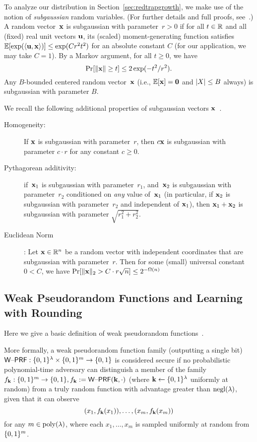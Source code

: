 To analyze our distribution in Section~\ref{sec:redtrapgrowth}, we
make use of the notion of \emph{subgaussian} random variables.  (For
further details and full proofs,
see~\cite{vershynin12:_compr_sensin_theor_applic}.)  A random
vector~$\mathbf{x}$ is subgaussian with parameter~$r > 0$ if for all $t \in \mathbb{R}$
and all (fixed) real unit vectors $\mathbf{u}$, its (scaled)
moment-generating function satisfies
$\operatorname*{\mathbb{E}}[\exp(\langle\mathbf{u},\mathbf{x}\rangle)] \leq \exp(C r^{2} t^{2})$ for an
absolute constant $C$ (for our application, we may take $C=1$).  By a Markov
argument, for all $t \geq 0$, we have
\begin{equation}
  \label{eq:subgaussian-tails}
  \Pr[\lVert\mathbf{x}\rVert \geq t] \leq 2 \exp(- t^{2}/r^{2}).
\end{equation}
 Any
$B$-bounded centered random vector~$\mathbf{x}$ (i.e., $\operatorname*{\mathbb{E}}[\mathbf{x}]=\mathbf{0}$ and $\lvert X\rvert
\leq B$ always) is subgaussian with parameter $B$.

We recall the following additional properties of subgaussian vectors
$\mathbf{x}$~\cite{vershynin12:_compr_sensin_theor_applic}.
\begin{description}
\item[Homogeneity:] If $\mathbf{x}$ is subgaussian with
parameter~$r$, then $c\mathbf{x}$ is subgaussian with parameter $c \cdot r$ for
any constant $c \geq 0$.
\item[Pythagorean
  additivity:] if~$\mathbf{x}_{1}$ is subgaussian with parameter~$r_{1}$,
and~$\mathbf{x}_{2}$ is subgaussian with parameter~$r_{2}$ conditioned on
\emph{any} value of~$\mathbf{x}_{1}$ (in particular, if $\mathbf{x}_2$ is
subgaussian with parameter~$r_2$ and independent of $\mathbf{x}_{1}$), then $\mathbf{x}_{1} + \mathbf{x}_{2}$ is subgaussian with parameter
$\sqrt{r_{1}^{2} + r_{2}^{2}}$.
\item[Euclidean Norm]: 
  Let $\mathbf{x} \in \mathbb{R}^{n}$ be a random vector with independent
  coordinates that are subgaussian with parameter~$r$.  Then for some
  (small)   universal constant $0 < C$, we have $\Pr[\lVert\mathbf{x}\rVert_{2} > C
  \cdot r\sqrt{n}] \leq 2^{-\Omega(n)}$
\end{description}

\subsection{Weak Pseudorandom Functions and Learning with Rounding}
\label{sec:weak-pseud-funct}
Here we give a basic definition of weak pseudorandom
functions~\cite{DBLP:conf/crypto/DamgardN02}.  

More formally, a weak pseudorandom
function family (outputting a single bit)
$\mathsf{W\text{\textendash}PRF}: \{0,1\}^{\lambda} \times \{0,1\}^{m} \to \{0,1\}$ is considered
secure if no probabilistic polynomial-time adversary can distinguish a
member of the family $f_{\mathbf{k}}:\{0,1\}^{m} \to \{0,1\}, f_{\mathbf{k}}:=\mathsf{W\text{\textendash}PRF}(\mathbf{k},\cdot)$ (where $\mathbf{k}
\gets \{0,1\}^{\lambda}$ uniformly at random) 
from a truly random function with advantage greater than
$\operatorname{negl}(\lambda)$, given that it can observe
\[(x_1, f_{\mathbf{k}}(x_1)), \ldots, (x_m, f_{\mathbf{k}}(x_m))\] for any $m \in \operatorname{poly}(\lambda)$,
where each $x_1, \ldots, x_m$ is sampled uniformly at random from
$\{0,1\}^{m}$. 

